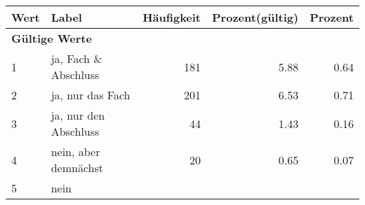      \begin{longtable}{lXrrr}
     \toprule
     \textbf{Wert} & \textbf{Label} & \textbf{Häufigkeit} & \textbf{Prozent(gültig)} & \textbf{Prozent} \\
     \endhead
     \midrule
     \multicolumn{5}{l}{\textbf{Gültige Werte}}\\

     1 &
     \multicolumn{1}{X}{ ja, Fach \& Abschluss   } &


       \num{181} &
       \num[round-mode=places,round-precision=2]{5,88} &
         \num[round-mode=places,round-precision=2]{0,64} \\

     2 &
     \multicolumn{1}{X}{ ja, nur das Fach   } &


       \num{201} &
       \num[round-mode=places,round-precision=2]{6,53} &
         \num[round-mode=places,round-precision=2]{0,71} \\

     3 &
     \multicolumn{1}{X}{ ja, nur den Abschluss   } &


       \num{44} &
       \num[round-mode=places,round-precision=2]{1,43} &
         \num[round-mode=places,round-precision=2]{0,16} \\

     4 &
     \multicolumn{1}{X}{ nein, aber demnächst   } &


       \num{20} &
       \num[round-mode=places,round-precision=2]{0,65} &
         \num[round-mode=places,round-precision=2]{0,07} \\

     5 &
     \multicolumn{1}{X}{ nein   } &



\end{longtable}
